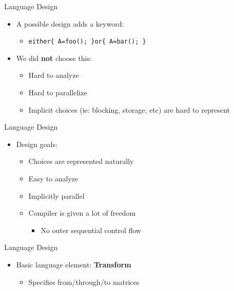 \documentclass[pdf,blends]{prosper}
\begin{document}
\begin{slide}{Language Design}
\begin{itemize}
\item A possible design adds a keyword:
  \begin{itemize}
  \item\small\tt either\{ A=foo(); \}or\{ A=bar(); \} 
  \end{itemize}
\item We did {\bf not} choose this:
  \begin{itemize}
  \item Hard to analyze 
  \item Hard to parallelize 
  \item Implicit choices (ie: blocking, storage, etc) are hard to represent 
  \end{itemize}
\end{itemize}
\end{slide}

\begin{slide}{Language Design}
\begin{itemize}
\item Design goals:
  \begin{itemize}
  \item Choices are represented naturally
  \item Easy to analyze
  \item Implicitly parallel
  \item Compiler is given a lot of freedom
  \begin{itemize}
    \item No outer sequential control flow
  \end{itemize}
  \end{itemize}
\end{itemize}
\end{slide}

\begin{slide}{Language Design}
\begin{itemize}
\item Basic language element: {\bf Transform}
  \begin{itemize}
  \item Specifies from/through/to matrices 
  \end{itemize}
\end{itemize}
\begin{center}
\end{center}
\end{slide}
\end{document}
